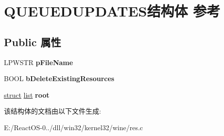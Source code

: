 \hypertarget{struct_q_u_e_u_e_d_u_p_d_a_t_e_s}{}\section{Q\+U\+E\+U\+E\+D\+U\+P\+D\+A\+T\+E\+S结构体 参考}
\label{struct_q_u_e_u_e_d_u_p_d_a_t_e_s}
\subsection*{Public 属性}
\begin{DoxyCompactItemize}
\item 
\mbox{\label{struct_q_u_e_u_e_d_u_p_d_a_t_e_s_a523e5a10dde4ab5306d42a19419c8a75}} 
L\+P\+W\+S\+TR {\bfseries p\+File\+Name}
\item 
\mbox{\label{struct_q_u_e_u_e_d_u_p_d_a_t_e_s_a68f1a491aef4ebffe85934781781973d}} 
B\+O\+OL {\bfseries b\+Delete\+Existing\+Resources}
\item 
\mbox{\label{struct_q_u_e_u_e_d_u_p_d_a_t_e_s_aa2d154ccf2550608ef1173c9d830555c}} 
\hyperlink{interfacestruct}{struct} \hyperlink{classlist}{list} {\bfseries root}
\end{DoxyCompactItemize}


该结构体的文档由以下文件生成\+:\begin{DoxyCompactItemize}
\item 
E\+:/\+React\+O\+S-\/0../dll/win32/kernel32/wine/res.\+c\end{DoxyCompactItemize}

